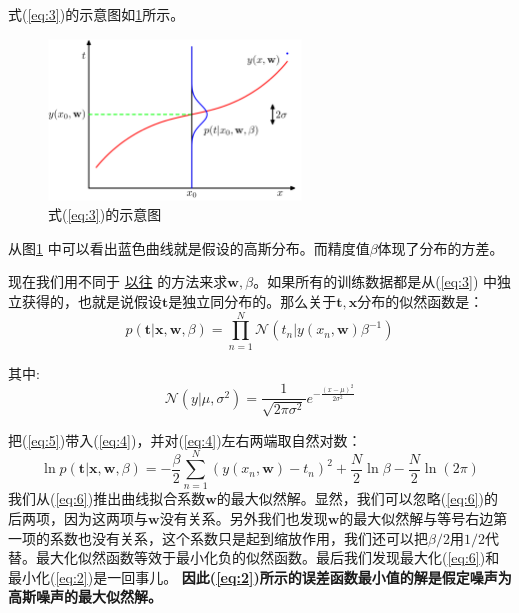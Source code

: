 \documentclass[10pt,a4paper,UTF8]{article}
\begin{document}
式(\ref{eq:3})的示意图如\ref{fig:org99f83d0}所示。
\begin{figure}[htbp]
\centering
\includegraphics[width=0.6\textwidth]{../../img/computer_prml/20170502figure1dot16.png}
\caption{\label{fig:org99f83d0}
式(\ref{eq:3})的示意图}
\end{figure}

从图\ref{fig:org99f83d0} 中可以看出蓝色曲线就是假设的高斯分布。而精度值\(\beta\)体现了分布的方差。

现在我们用不同于 \href{PRMLch1dot1-polynomial-curve.org}{以往} 的方法来求\(\mathbf{w},\beta\)。如果所有的训练数据都是从(\ref{eq:3}) 中独立获得的，也就是说假设\(\mathbf{t}\)是独立同分布的。那么关于\(\mathbf{t},\mathbf{x}\)分布的似然函数是：
\begin{equation}
\label{eq:4}
p( \mathbf{t} | \mathbf{x}, \mathbf{w},\beta) = \prod_{n=1}^{N} \mathcal{N}(t_{n}|y(x_{n}, \mathbf{w}) \beta^{-1} )
\end{equation}

其中:
\begin{equation}
\label{eq:5}
\mathcal{N} (y| \mu, \sigma^{2} ) = \frac{1}{\sqrt{2\pi \sigma^{2}}} e^{-\frac{(x-\mu)^{2}}{2\sigma^{2}}}
\end{equation}

把(\ref{eq:5})带入(\ref{eq:4})，并对(\ref{eq:4})左右两端取自然对数：
\begin{equation}
\label{eq:6}
\ln p( \mathbf{t} | \mathbf{x}, \mathbf{w}, \beta) = -\frac{\beta}{2}\sum_{n=1}^{N}(y(x_{n}, \mathbf{w}) - t_{n})^{2} + \frac{N}{2}\ln \beta - \frac{N}{2}\ln(2\pi)
\end{equation}
我们从(\ref{eq:6})推出曲线拟合系数\(\mathbf{w}\)的最大似然解。显然，我们可以忽略(\ref{eq:6})的后两项，因为这两项与\(\mathbf{w}\)没有关系。另外我们也发现\(\mathbf{w}\)的最大似然解与等号右边第一项的系数也没有关系，这个系数只是起到缩放作用，我们还可以把\(\beta/2\)用\(1/2\)代替。最大化似然函数等效于最小化负的似然函数。最后我们发现最大化(\ref{eq:6})和最小化(\ref{eq:2})是一回事儿。 \textbf{因此(\ref{eq:2})所示的误差函数最小值的解是假定噪声为高斯噪声的最大似然解。}
\end{document}
